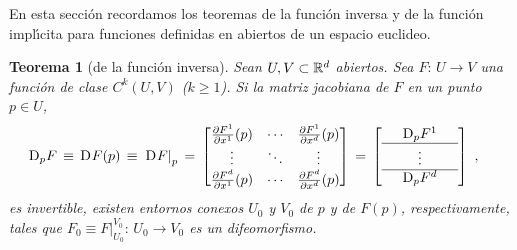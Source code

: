 \theoremstyle{plain}
\newtheorem{teoFunInversa}{Teorema}[section]
\newtheorem{coroFunInversa}[teoFunInversa]{Corolario}
\newtheorem{teoFunImplicita}[teoFunInversa]{Teorema}

\theoremstyle{remark}


En esta secci\'{o}n recordamos los teoremas de la funci\'{o}n inversa y
de la funci\'{o}n impl\'{\i}cita para funciones definidas en abiertos
de un espacio euclideo.

\begin{teoFunInversa}[de la funci\'{o}n inversa]\label{thm:funinversa}
	Sean $U,V\subset\bb{R}^{d}$ abiertos. Sea $F:\,U\rightarrow V$ una
	funci\'{o}n de clase $C^{k}(U,V)$ ($k\geq 1$). Si la matriz
	jacobiana de $F$ en un punto $p\in U$,
	\begin{align*}
		\jacobiana[p]{F} & \,\equiv\,\jacobiana{F}(p)\,\equiv\,
			\left.\jacobiana{F}\right|_{p}
		\,=\,	\begin{bmatrix}
				\derivada{F^{1}}{x^{1}}(p) & \cdots &
					\derivada{F^{1}}{x^{d}}(p) \\
				\vdots & \ddots & \vdots \\
				\derivada{F^{d}}{x^{1}}(p) & \cdots &
					\derivada{F^{d}}{x^{d}}(p)
			\end{bmatrix}
		\,=\,	\left[
			\begin{array}{ccc}
				& \jacobiana[p]{F^{1}} & \\
				\hline
				& \vdots & \\
				\hline
				& \jacobiana[p]{F^{d}} &
			\end{array}
			\right]
		\text{ ,}
	\end{align*}
	es invertible, existen entornos conexos $U_{0}$ y $V_{0}$ de
	$p$ y de $F(p)$, respectivamente, tales que
	$F_{0}\equiv F|_{U_{0}}^{V_{0}}:\,U_{0}\rightarrow V_{0}$
	es un difeomorfismo.
\end{teoFunInversa}

